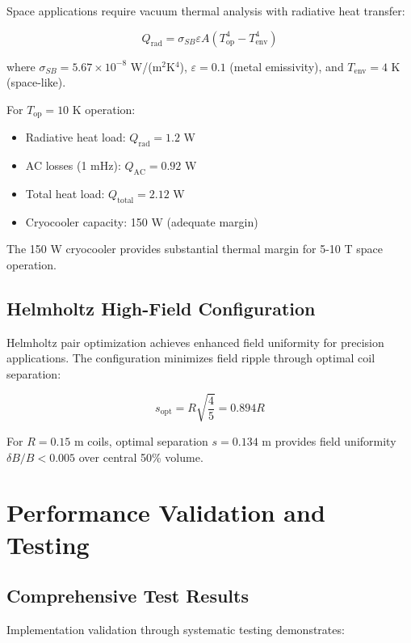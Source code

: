 Space applications require vacuum thermal analysis with radiative heat transfer:

\begin{equation}
Q_{\text{rad}} = \sigma_{SB} \varepsilon A (T_{\text{op}}^4 - T_{\text{env}}^4)
\end{equation}

where $\sigma_{SB} = 5.67 \times 10^{-8}$ W/(m$^2$K$^4$), $\varepsilon = 0.1$ (metal emissivity), and $T_{\text{env}} = 4$ K (space-like).

For $T_{\text{op}} = 10$ K operation:
\begin{itemize}
\item Radiative heat load: $Q_{\text{rad}} = 1.2$ W
\item AC losses (1 mHz): $Q_{\text{AC}} = 0.92$ W
\item Total heat load: $Q_{\text{total}} = 2.12$ W
\item Cryocooler capacity: 150 W (adequate margin)
\end{itemize}

The 150 W cryocooler provides substantial thermal margin for 5-10 T space operation.

\subsection{Helmholtz High-Field Configuration}

Helmholtz pair optimization achieves enhanced field uniformity for precision applications. The configuration minimizes field ripple through optimal coil separation:

\begin{equation}
s_{\text{opt}} = R \sqrt{\frac{4}{5}} = 0.894 R
\end{equation}

For $R = 0.15$ m coils, optimal separation $s = 0.134$ m provides field uniformity $\delta B/B < 0.005$ over central 50\% volume.

\section{Performance Validation and Testing}

\subsection{Comprehensive Test Results}

Implementation validation through systematic testing demonstrates:

